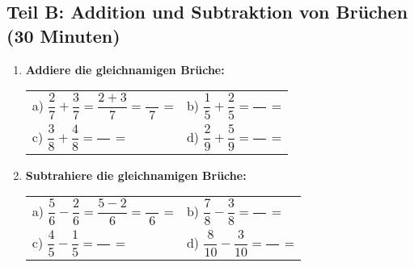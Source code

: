 \subsection*{Teil B: Addition und Subtraktion von Brüchen (30 Minuten)}

\begin{enumerate}[label=\arabic*.]
    \item \textbf{Addiere die gleichnamigen Brüche:}
    \vspace{0.5cm}
    \begin{tabular}{ll}
        a) $\dfrac{2}{7} + \dfrac{3}{7} = \dfrac{2+3}{7} = \dfrac{\phantom{00}}{7}$ = \underline{\hspace{3cm}} &
        b) $\dfrac{1}{5} + \dfrac{2}{5} = \dfrac{\phantom{00}}{\phantom{00}}$ = \underline{\hspace{3cm}} \\[4ex]
        c) $\dfrac{3}{8} + \dfrac{4}{8} = \dfrac{\phantom{00}}{\phantom{00}}$ = \underline{\hspace{3cm}} &
        d) $\dfrac{2}{9} + \dfrac{5}{9} = \dfrac{\phantom{00}}{\phantom{00}}$ = \underline{\hspace{3cm}}
    \end{tabular}

    \vspace{1cm}

    \item \textbf{Subtrahiere die gleichnamigen Brüche:}
    \vspace{0.5cm}
    \begin{tabular}{ll}
        a) $\dfrac{5}{6} - \dfrac{2}{6} = \dfrac{5-2}{6} = \dfrac{\phantom{00}}{6}$ = \underline{\hspace{3cm}} &
        b) $\dfrac{7}{8} - \dfrac{3}{8} = \dfrac{\phantom{00}}{\phantom{00}}$ = \underline{\hspace{3cm}} \\[4ex]
        c) $\dfrac{4}{5} - \dfrac{1}{5} = \dfrac{\phantom{00}}{\phantom{00}}$ = \underline{\hspace{3cm}} &
        d) $\dfrac{8}{10} - \dfrac{3}{10} = \dfrac{\phantom{00}}{\phantom{00}}$ = \underline{\hspace{3cm}}
    \end{tabular}

    \vspace{1cm}


\end{enumerate}
